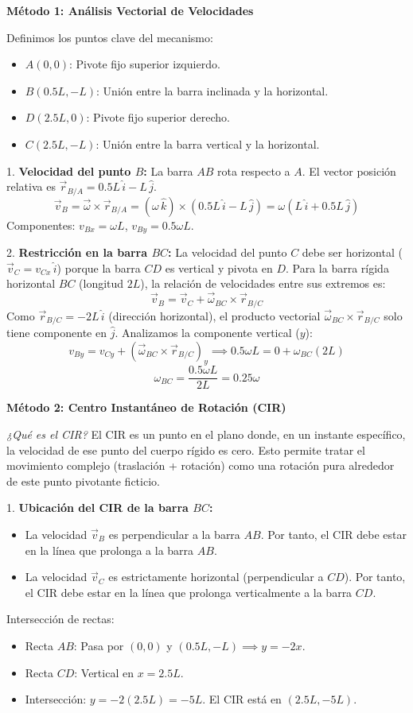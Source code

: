 \documentclass{article}
\begin{document}
\textbf{Método 1: Análisis Vectorial de Velocidades}

Definimos los puntos clave del mecanismo:
\begin{itemize}
    \item $A(0,0)$: Pivote fijo superior izquierdo.
    \item $B(0.5L, -L)$: Unión entre la barra inclinada y la horizontal.
    \item $D(2.5L, 0)$: Pivote fijo superior derecho.
    \item $C(2.5L, -L)$: Unión entre la barra vertical y la horizontal.
\end{itemize}

1. \textbf{Velocidad del punto $B$:}
La barra $AB$ rota respecto a $A$. El vector posición relativa es $\vec{r}_{B/A} = 0.5L\,\hat{i} - L\,\hat{j}$.
$$ \vec{v}_B = \vec{\omega} \times \vec{r}_{B/A} = (\omega\,\hat{k}) \times (0.5L\,\hat{i} - L\,\hat{j}) = \omega(L\,\hat{i} + 0.5L\,\hat{j}) $$
Componentes: $v_{Bx} = \omega L$, $v_{By} = 0.5\omega L$.

2. \textbf{Restricción en la barra $BC$:}
La velocidad del punto $C$ debe ser horizontal ($\vec{v}_C = v_{Cx}\,\hat{i}$) porque la barra $CD$ es vertical y pivota en $D$.
Para la barra rígida horizontal $BC$ (longitud $2L$), la relación de velocidades entre sus extremos es:
$$ \vec{v}_B = \vec{v}_C + \vec{\omega}_{BC} \times \vec{r}_{B/C} $$
Como $\vec{r}_{B/C} = -2L\,\hat{i}$ (dirección horizontal), el producto vectorial $\vec{\omega}_{BC} \times \vec{r}_{B/C}$ solo tiene componente en $\hat{j}$.
Analizamos la componente vertical ($y$):
$$ v_{By} = v_{Cy} + (\vec{\omega}_{BC} \times \vec{r}_{B/C})_y \implies 0.5\omega L = 0 + \omega_{BC}(2L) $$
$$ \omega_{BC} = \frac{0.5\omega L}{2L} = 0.25\omega $$

\textbf{Método 2: Centro Instantáneo de Rotación (CIR)}

\textit{¿Qué es el CIR?} El CIR es un punto en el plano donde, en un instante específico, la velocidad de ese punto del cuerpo rígido es cero. Esto permite tratar el movimiento complejo (traslación + rotación) como una rotación pura alrededor de este punto pivotante ficticio.

1. \textbf{Ubicación del CIR de la barra $BC$:}
\begin{itemize}
    \item La velocidad $\vec{v}_B$ es perpendicular a la barra $AB$. Por tanto, el CIR debe estar en la línea que prolonga a la barra $AB$.
    \item La velocidad $\vec{v}_C$ es estrictamente horizontal (perpendicular a $CD$). Por tanto, el CIR debe estar en la línea que prolonga verticalmente a la barra $CD$.
\end{itemize}
Intersección de rectas:
\begin{itemize}
    \item Recta $AB$: Pasa por $(0,0)$ y $(0.5L, -L) \implies y = -2x$.
    \item Recta $CD$: Vertical en $x = 2.5L$.
    \item Intersección: $y = -2(2.5L) = -5L$. El CIR está en $(2.5L, -5L)$.
\end{itemize}
\end{document}
